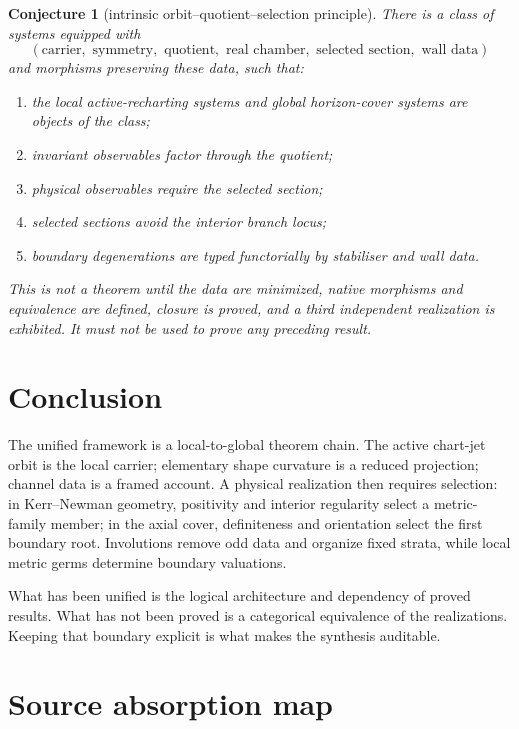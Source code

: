 \documentclass[11pt]{article}
\newtheorem{conjecture}[theorem]{Conjecture}
\theoremstyle{remark}
\newcommand{\proofstop}[1]{\par\medskip\noindent{\color{red!75!black}\textbf{STOP--PROOF.}} \textit{#1}\par\medskip}
\begin{document}
\begin{conjecture}[intrinsic orbit--quotient--selection principle]
There is a class of systems equipped with
\[
(\text{carrier},\text{ symmetry},\text{ quotient},
\text{ real chamber},\text{ selected section},\text{ wall data})
\]
and morphisms preserving these data, such that:
\begin{enumerate}[label=(\roman*)]
\item the local active-recharting systems and global horizon-cover systems are
objects of the class;
\item invariant observables factor through the quotient;
\item physical observables require the selected section;
\item selected sections avoid the interior branch locus;
\item boundary degenerations are typed functorially by stabiliser and wall
data.
\end{enumerate}
\end{conjecture}

\proofstop{This is not a theorem until the data are minimized, native
morphisms and equivalence are defined, closure is proved, and a third
independent realization is exhibited. It must not be used to prove any
preceding result.}

\section{Conclusion}

The unified framework is a local-to-global theorem chain. The active
chart-jet orbit is the local carrier; elementary shape curvature is a reduced
projection; channel data is a framed account. A physical realization then
requires selection: in Kerr--Newman geometry, positivity and interior
regularity select a metric-family member; in the axial cover, definiteness
and orientation select the first boundary root. Involutions remove odd data
and organize fixed strata, while local metric germs determine boundary
valuations.

What has been unified is the logical architecture and dependency of proved
results. What has not been proved is a categorical equivalence of the
realizations. Keeping that boundary explicit is what makes the synthesis
auditable.

\appendix

\section{Source absorption map}
\end{document}
